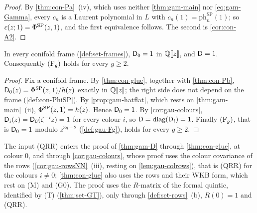 \begin{proof}
By \cref{thm:con-Pa}~(iv), which uses neither \cref{thm:gam-main} nor \eqref{eq:gam-Gamma}, every $c_n$ is a Laurent polynomial in $L$ with $c_n(1)=\mathrm{ph}^{\mathrm{SP}}_n(1)$; so $c(z;1)=\Phi^{\mathrm{SP}}(z,1)$, and the first equivalence follows. The second is \cref{cor:con-A2}.
\end{proof}

\begin{thm}
\label{thm:gam-D}
In every conifold frame (\cref{def:set-frames}), $\mathsf{D}_0=1$ in $\mathbb{Q}[\![ z ]\!]$, and $\mathsf{D}=1$. Consequently $(\mathrm{F}_{g})$ holds for every $g\geq 2$.
\end{thm}

\begin{proof}
Fix a conifold frame. By \cref{thm:con-glue}, together with \cref{thm:con-Pb}, $\mathsf{D}_0(z)=\Phi^{\mathrm{SP}}(z,1)/h(z)$ exactly in $\mathbb{Q}[\![ z ]\!]$; the right side does not depend on the frame (\cref{def:con-PhiSP}). By \cref{prop:gam-hatflat}, which rests on \cref{thm:gam-main}~(ii), $\Phi^{\mathrm{SP}}(z,1)=h(z)$. Hence $\mathsf{D}_0=1$. By \cref{cor:gau-colours}, $\mathsf{D}_i(z)=\mathsf{D}_0(\zeta^{-i}z)=1$ for every colour $i$, so $\mathsf{D}=\operatorname{diag}(\mathsf{D}_i)=1$. Finally $(\mathrm{F}_{g})$, that is $\mathsf{D}_0=1$ modulo $z^{3g-2}$ (\cref{def:gau-Fg}), holds for every $g\geq 2$.
\end{proof}

The input (QRR) enters the proof of \cref{thm:gam-D} through \cref{thm:con-glue}, at colour $0$, and through \cref{cor:gau-colours}, whose proof uses the colour covariance of the rows (\cref{cor:gau-rowsNN}~(iii), resting on \cref{lem:gau-colrows}), that is (QRR) for the colours $i\neq0$; \cref{thm:con-glue} also uses the rows and their WKB form, which rest on (M) and (G0). The proof uses the $R$-matrix of the formal quintic, identified by (T) (\cref{thm:set-GT}), only through \cref{def:set-rows}~(b), $R(0)=1$ and (QRR).


